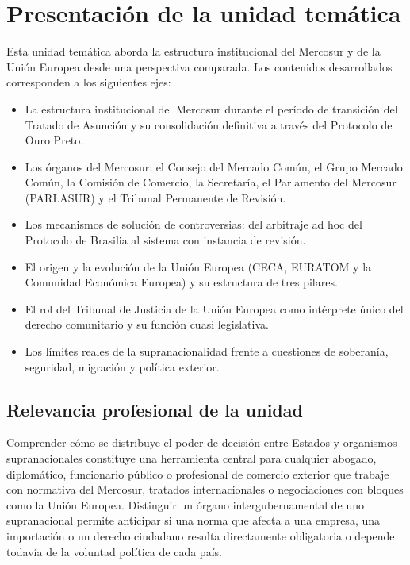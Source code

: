 \documentclass[12pt,oneside]{book}
\begin{document}
\chapter*{Presentación de la unidad temática}

Esta unidad temática aborda la estructura institucional del Mercosur y de la Unión Europea desde una perspectiva comparada. Los contenidos desarrollados corresponden a los siguientes ejes:

\begin{itemize}
    \item La estructura institucional del Mercosur durante el período de transición del Tratado de Asunción y su consolidación definitiva a través del Protocolo de Ouro Preto.
    \item Los órganos del Mercosur: el Consejo del Mercado Común, el Grupo Mercado Común, la Comisión de Comercio, la Secretaría, el Parlamento del Mercosur (PARLASUR) y el Tribunal Permanente de Revisión.
    \item Los mecanismos de solución de controversias: del arbitraje ad hoc del Protocolo de Brasilia al sistema con instancia de revisión.
    \item El origen y la evolución de la Unión Europea (CECA, EURATOM y la Comunidad Económica Europea) y su estructura de tres pilares.
    \item El rol del Tribunal de Justicia de la Unión Europea como intérprete único del derecho comunitario y su función cuasi legislativa.
    \item Los límites reales de la supranacionalidad frente a cuestiones de soberanía, seguridad, migración y política exterior.
\end{itemize}

\section*{Relevancia profesional de la unidad}

Comprender cómo se distribuye el poder de decisión entre Estados y organismos supranacionales constituye una herramienta central para cualquier abogado, diplomático, funcionario público o profesional de comercio exterior que trabaje con normativa del Mercosur, tratados internacionales o negociaciones con bloques como la Unión Europea. Distinguir un órgano intergubernamental de uno supranacional permite anticipar si una norma que afecta a una empresa, una importación o un derecho ciudadano resulta directamente obligatoria o depende todavía de la voluntad política de cada país.
\end{document}
